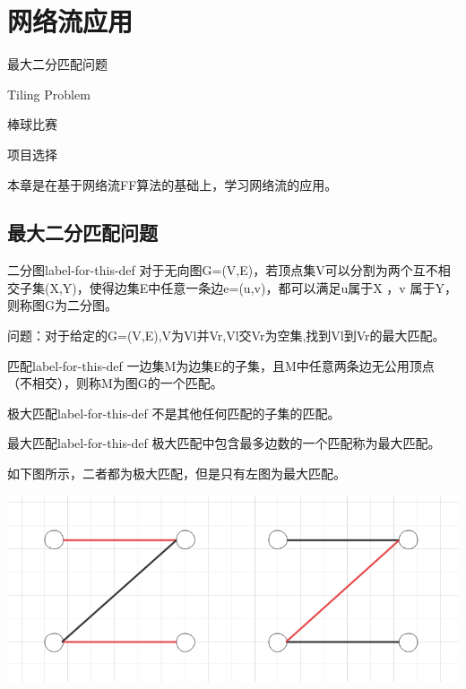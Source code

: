 \chapter{网络流应用}

\begin{introduction}
\item 最大二分匹配问题
\item Tiling Problem
\item 棒球比赛
\item 项目选择
\end{introduction}

本章是在基于网络流FF算法的基础上，学习网络流的应用。

\section{最大二分匹配问题}

\begin{definition}{二分图}{label-for-this-def}
    对于无向图G=(V,E)，若顶点集V可以分割为两个互不相交子集(X,Y)，使得边集E中任意一条边e=(u,v)，都可以满足u属于X ，v 属于Y，则称图G为二分图。
\end{definition}

问题：对于给定的G=(V,E),V为Vl并Vr,Vl交Vr为空集,找到Vl到Vr的最大匹配。

\begin{definition}{匹配}{label-for-this-def}
    一边集M为边集E的子集，且M中任意两条边无公用顶点（不相交），则称M为图G的一个匹配。
\end{definition}

\begin{definition}{极大匹配}{label-for-this-def}
    不是其他任何匹配的子集的匹配。
\end{definition}

\begin{definition}{最大匹配}{label-for-this-def}
    极大匹配中包含最多边数的一个匹配称为最大匹配。
\end{definition}

如下图所示，二者都为极大匹配，但是只有左图为最大匹配。\\
\centerline{\includegraphics[scale=0.4]{image/networkflow1.png}}

